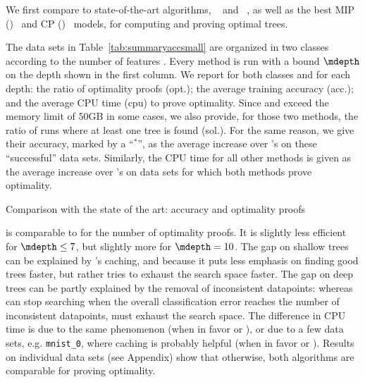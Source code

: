 \documentclass{article}
\begin{document}
We first compare \blossom to state-of-the-art algorithms, \murtree~\cite{DBLP:journals/corr/abs-2007-12652} and \dleight~\cite{dl85}, as well as the best MIP (\binoct)~\cite{verwer2019learning} and CP (\cp)~\cite{verhaeghe2019learning} models, for computing and proving optimal trees. 

The data sets in Table~\ref{tab:summaryaccsmall} are organized 
in two classes according to 
the number of features \numfeat.
Every method is run with a bound $\mdepth$ on the depth shown in the first column. 
We report for both classes and for each depth: the ratio of optimality proofs (opt.); the average training accuracy (acc.); and %
 the average CPU time (cpu) to prove optimality.
Since \dleight and \binoct exceed the memory limit of 50GB in some cases, we also provide, for those two methods, the ratio of runs where at least one tree is found (sol.). For the same reason, we give their accuracy, marked by a ``$^*$'', as the average increase over \blossom's on these ``successful'' data sets. 
Similarly, the CPU time for all other methods is given as the average increase over \blossom's on data sets for which both methods prove optimality.



\begin{table}[htbp]
\begin{center}
\begin{footnotesize}
\tabcolsep=2.75pt

\end{footnotesize}
\end{center}
\caption{\label{tab:summaryaccsmall} Comparison with the state of the art: accuracy and optimality proofs}
\end{table}


\blossom is comparable to \murtree for the number of optimality proofs.
It is slightly less efficient for  $\mdepth \leq 7$, but slightly more for $\mdepth = 10$. The gap on shallow trees can be explained by \murtree's caching, and because it puts less emphasis on finding good trees faster, but rather tries to exhaust the search space faster. The gap on deep trees can be partly explained by the removal of inconsistent datapoints: whereas \blossom can stop searching when the overall classification error reaches the number of inconsistent datapoints, \murtree must exhaust the search space. 
The difference in CPU time is due to the same phenomenon (when in favor or \blossom), or due to a few data sets, e.g. \texttt{mnist\_0}, where caching is probably helpful (when in favor or \murtree). Results on individual data sets (see Appendix) show that otherwise, both algorithms are comparable for proving optimality.
\end{document}
